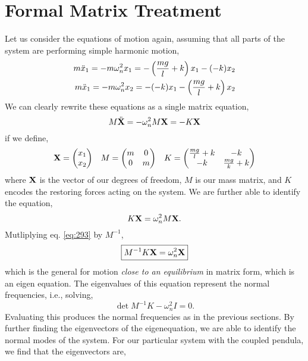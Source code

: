 \documentclass{book}
\begin{document}
\section{Formal Matrix Treatment}
Let us consider the equations of motion again, assuming that all parts of the system are performing simple harmonic motion,
\begin{align}
	m\Ddot{x}_1 = -m\omega_n^2x_1 = -\left(\frac{mg}{l} + k\right)x_1 -(-k)x_2\label{eq:12} \\
	m\Ddot{x}_1 = -m\omega_n^2x_2 = -(-k)x_1 -\left(\frac{mg}{l} + k\right)x_2 \label{eq:22} \\
\end{align}
We can clearly rewrite these equations as a single matrix equation,
\begin{equation}
	M\Ddot{\vb{X}} = -\omega_n^2M\vb{X} = -K\vb{X}
\end{equation}
if we define,
\begin{align}
	\vb{X} = \begin{pmatrix}
		x_1 \\ x_2
	\end{pmatrix} && M = \begin{pmatrix}
	m & 0 \\ 0 & m
	\end{pmatrix} && K = \begin{pmatrix}
	\frac{mg}{l}+k & -k \\
	-k & \frac{mg}{k}+k
	\end{pmatrix}
\end{align}
where $\vb{X}$ is the vector of our degrees of freedom, $M$ is our mass matrix, and $K$ encodes the restoring forces acting on the system. We are further able to identify the equation,
\begin{equation}
	K\vb{X} = \omega_n^2M\vb{X}. \label{eq:293}
\end{equation}
Mutliplying eq. \eqref{eq:293} by $M^{-1}$,
\begin{equation}
	\boxed{M^{-1}K \vb{X} = \omega_n ^2\vb{X}} \label{eq:matrix eq motion}
\end{equation}
which is the general for motion \textit{close to an equilibrium} in matrix form, which is an eigen equation. The eigenvalues of this equation represent the normal frequencies, i.e., solving,
\begin{equation}
	\det{M^{-1}K - \omega_n^2I} = 0.
\end{equation} 
Evaluating this produces the normal frequencies as in the previous sections. By further finding the eigenvectors of the eigenequation, we are able to identify the normal modes of the system. For our particular system with the coupled pendula, we find that the eigenvectors are,
\end{document}
